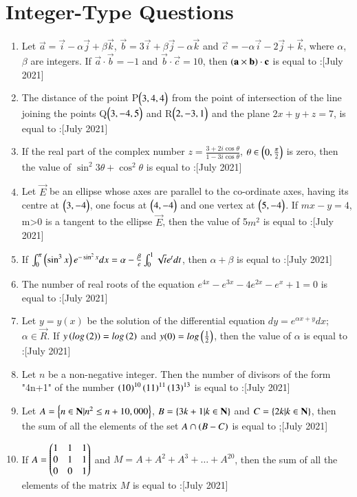 \documentclass[journal,12pt,onecolumn]{IEEEtran}
\theoremstyle{remark}
\begin{document}
\section{Integer-Type Questions}
\begin{enumerate}
	\item Let $\vec{a} = \vec{i} - \alpha\vec{j} + \beta\vec{k}$, $\vec{b} = 3\vec{i} + \beta\vec{j} - \alpha\vec{k}$ and $\vec{c} = -\alpha\vec{i} - 2\vec{j} + \vec{k}$, where $\alpha$, $\beta$ are integers. If $\vec{a} \cdot \vec{b} = -1$ and $\vec{b} \cdot \vec{c} = 10$, then $\left(\mathbf{a} \times \mathbf{b}\right) \cdot \mathbf{c}$ is equal to :\hfill{[July 2021]}
	\item The distance of the point P$\begin{pmatrix}3,4,4\end{pmatrix}$ from the point of intersection of the line joining the points Q$\begin{pmatrix}3,-4,5\end{pmatrix}$ and R$\begin{pmatrix}2,-3,1\end{pmatrix}$ and the plane $2x+y+z=7$, is equal to :\hfill{[July 2021]}
	\item If the real part of the complex number $ z = \frac{3+2i\cos{\theta}}{1-3i\cos{\theta}}$, $\theta \in \left(0, \frac{\pi}{2}\right)$ is zero, then the value of $\sin^{2}{3\theta} + \cos^{2}{\theta}$ is equal to :\hfill{[July 2021]}
	\item Let $\vec{E}$ be an ellipse whose axes are parallel to the co-ordinate axes, having its centre at $\begin{pmatrix}3,-4\end{pmatrix}$, one focus at $\begin{pmatrix}4,-4\end{pmatrix}$ and one vertex at $\begin{pmatrix}5,-4\end{pmatrix}$. If $mx - y = 4$, m>0 is a tangent to the ellipse $\vec{E}$, then the value of 5$m^2$ is equal to :\hfill{[July 2021]}
	\item If $\int_{0}^{\pi} \left(\sin^{3}{x}\right)e^{-\sin^{2}{x}} dx = \alpha - \frac{\beta}{e} \int_{0}^{1} \sqrt{t}e^{t} dt$, then $\alpha + \beta$ is equal to :\hfill{[July 2021]}
	\item The number of real roots of the equation $ e^{4x} - e^{3x} - 4e^{2x} - e^{x} + 1 = 0$ is equal to :\hfill{[July 2021]}
	\item Let $ y = y(x) $ be the solution of the differential equation $ dy = e^{\alpha x + y} dx $; $\alpha \in \vec{R}$. If $ y\left(log\left(2\right)\right) = log\left(2\right)$ and $y(0) = log\left(\frac{1}{2}\right)$, then the value of $\alpha$ is equal to :\hfill{[July 2021]}
	\item Let $n$ be a non-negative integer. Then the number of divisors of the form "4n+1" of the number $\left(10\right)^{10}\left(11\right)^{11}\left(13\right)^{13}$ is equal to :\hfill{[July 2021]}
	\item Let $A = \left\{n \in \mathbf{N} | n^2 \leq n + 10,000\right\}$, $B = \left\{3k+1 | k \in \mathbf{N}\right\}$ and $C = \left\{2k | k \in \mathbf{N}\right\}$, then the sum of all the elements of the set $ A \cap \left( B-C\right)$ is equal to ;\hfill{[July 2021]}
	\item If $A = \begin{pmatrix}1&1&1\\0&1&1\\0&0&1\end{pmatrix}$ and $M = A + A^2 + A^3 + \dots + A^{20} $, then the sum of all the elements of the matrix $M$ is equal to :\hfill{[July 2021]}
\end{enumerate}
\end{document}
